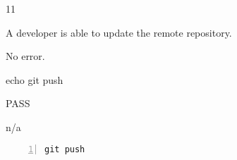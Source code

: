 \begin{description}[align=right,leftmargin=3.2cm,labelindent=3.0cm]
\item[Step:] 11
\item[Confirm:] A developer is able to update the remote repository.
\item[Expectation:] No error.
\item[Command:] echo git  push
\item[Test Result:] PASS
\item[Evidence:] n/a
\end{description}
\begin{lstlisting}[numbers=left]
git push

\end{lstlisting}
